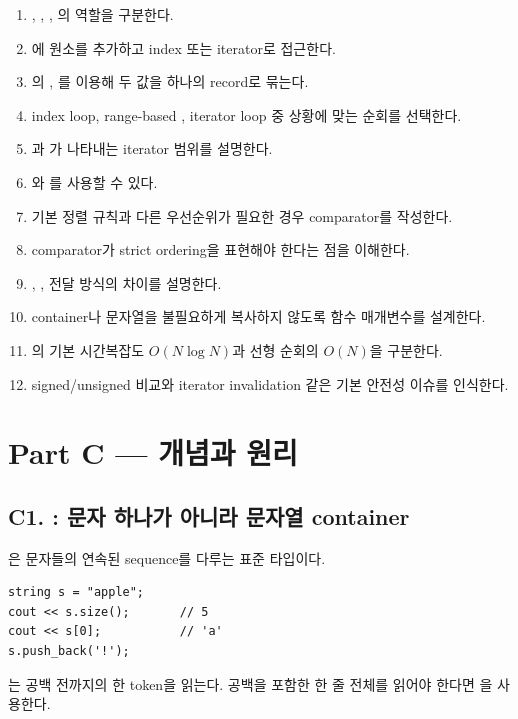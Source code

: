 \begin{enumerate}
  \item {}, , , 의 역할을 구분한다.
  \item {}에 원소를 추가하고 index 또는 iterator로 접근한다.
  \item {}의 , 를 이용해 두 값을 하나의 record로 묶는다.
  \item index loop, range-based , iterator loop 중 상황에 맞는 순회를 선택한다.
  \item {}과 가 나타내는 iterator 범위를 설명한다.
  \item {}와 를 사용할 수 있다.
  \item 기본 정렬 규칙과 다른 우선순위가 필요한 경우 comparator를 작성한다.
  \item comparator가 strict ordering을 표현해야 한다는 점을 이해한다.
  \item {}, ,  전달 방식의 차이를 설명한다.
  \item container나 문자열을 불필요하게 복사하지 않도록 함수 매개변수를 설계한다.
  \item {}의 기본 시간복잡도 $O(N\log N)$과 선형 순회의 $O(N)$을 구분한다.
  \item signed/unsigned 비교와 iterator invalidation 같은 기본 안전성 이슈를 인식한다.
\end{enumerate}

\section{Part C --- 개념과 원리}

\subsection{C1. : 문자 하나가 아니라 문자열 container}
은 문자들의 연속된 sequence를 다루는 표준 타입이다.
\begin{lstlisting}
string s = "apple";
cout << s.size();       // 5
cout << s[0];           // 'a'
s.push_back('!');
\end{lstlisting}

는 공백 전까지의 한 token을 읽는다. 공백을 포함한 한 줄 전체를 읽어야 한다면 을 사용한다.

